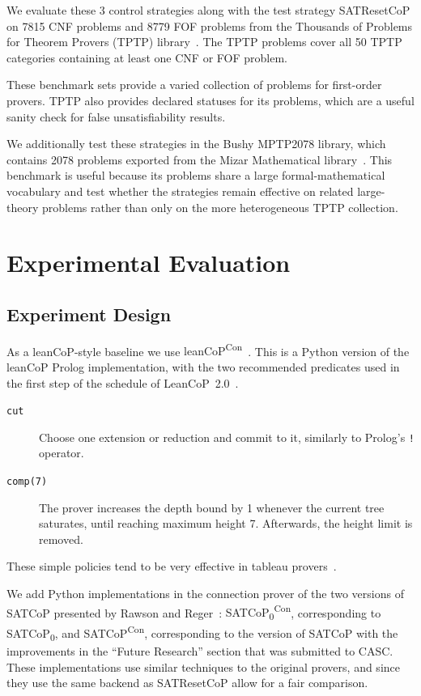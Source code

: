 \documentclass{EasyChair3.5/easychair}
\newcommand{\cop}[1]{\textsf{#1}}
\newcommand{\leancopc}{\cop{leanCoP\textsuperscript{Con}}}
\newcommand{\satcopzc}{\cop{SATCoP\textsubscript{0}\textsuperscript{Con}}}
\newcommand{\satcopc}{\cop{SATCoP\textsuperscript{Con}}}
\begin{document}
We evaluate these 3 control strategies along with the test strategy \cop{SATResetCoP} on \num{7815} CNF problems and \num{8779} FOF problems from the Thousands of Problems for Theorem Provers (TPTP) library~\cite{tptp}.
The TPTP problems cover all 50 TPTP categories containing at least one CNF or FOF problem.

These benchmark sets provide a varied collection of problems for first-order provers.
TPTP also provides declared statuses for its problems, which are a useful sanity check for false unsatisfiability results.

We additionally test these strategies in the Bushy MPTP2078 library, which contains \num{2078} problems exported from the Mizar Mathematical library~\cite{mptp2078}.
This benchmark is useful because its problems share a large formal-mathematical vocabulary and test whether the strategies remain effective on related large-theory problems rather than only on the more heterogeneous TPTP collection.

\section{Experimental Evaluation}

\subsection{Experiment Design}

As a \cop{leanCoP}-style baseline we use \leancopc{}~\cite{leancopcut}.
This is a Python version of the \cop{leanCoP} Prolog implementation, with the two recommended predicates used in the first step of the schedule of \cop{LeanCoP~2.0}~\cite[\S~5.5]{leancopcut}.
\begin{description}
	\item[\texttt{cut}] Choose one extension or reduction and commit to it, similarly to Prolog's \texttt{!} operator.
	\item[\texttt{comp(7)}] The prover increases the depth bound by 1 whenever the current tree saturates, until reaching maximum height 7.
		Afterwards, the height limit is removed.
\end{description}

These simple policies tend to be very effective in tableau provers~\cite{leancopoverview}.

We add Python implementations in the connection prover of the two versions of \cop{SATCoP} presented by Rawson and Reger~\cite{satcop}: \satcopzc{}, corresponding to \cop{SATCoP\textsubscript{0}}, and \satcopc{}, corresponding to the version of \cop{SATCoP} with the improvements in the ``Future Research'' section that was submitted to CASC.
These implementations use similar techniques to the original provers, and since they use the same backend as \cop{SATResetCoP} allow for a fair comparison.
\end{document}
